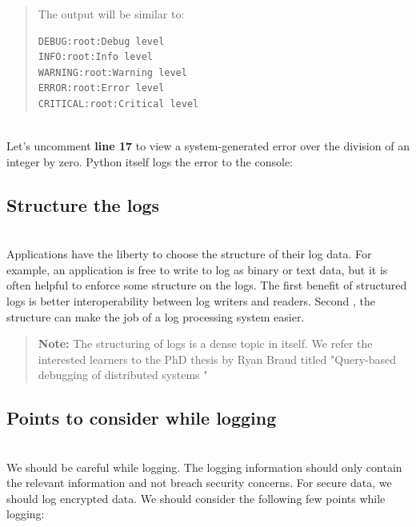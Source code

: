 \begin{quote}
The output will be similar to:

\begin{verbatim}
DEBUG:root:Debug level
INFO:root:Info level
WARNING:root:Warning level
ERROR:root:Error level
CRITICAL:root:Critical level
\end{verbatim}
\end{quote}
\\
Let's uncomment \textbf{line 17} to view a system-generated error over the division of an integer by zero. Python itself logs the error to the console:

\subsection{Structure the logs}\label{W3ApynimIMVPan1jXATs8}
\\
Applications have the liberty to choose the structure of their log data. For example, an application is free to write to log as binary or text data, but it is often helpful to enforce some structure on the logs. The first benefit of structured logs is better interoperability between log writers and readers. Second , the structure can make the job of a log processing system easier.
\begin{quote}
\textbf{Note:} The structuring of logs is a dense topic in itself. We refer the interested learners to the PhD thesis by Ryan Braud titled "Query-based debugging of distributed systems "
\end{quote}
\subsection{Points to consider while logging}\label{y1jGXw_ybPk1RopvQzC2_}
\\
We should be careful while logging. The logging information should only contain the relevant information and not breach security concerns. For secure data, we should log encrypted data. We should consider the following few points while logging:

